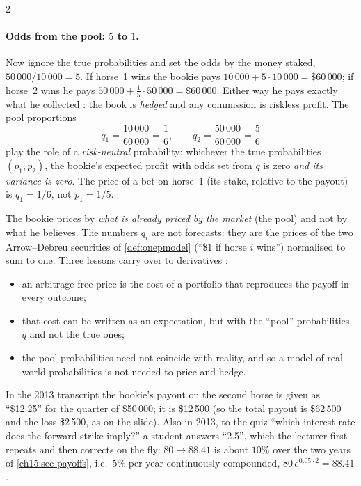 \begin{paracol}{2}
\paragraph{Odds from the pool: $5$ to $1$.} Now ignore the true probabilities and set the odds by the money
staked, $50\,000/10\,000=5$. If horse~1 wins the bookie pays $10\,000+5\cdot10\,000=\$60\,000$; if horse~2 wins he pays
$50\,000+\tfrac15\cdot50\,000=\$60\,000$. Either way he pays exactly what he collected : the book is
\emph{hedged} and any commission is riskless profit. The pool proportions
\[
  q_1=\frac{10\,000}{60\,000}=\frac16,\qquad q_2=\frac{50\,000}{60\,000}=\frac56
\]
play the role of a \emph{risk-neutral} probability: whichever the true probabilities $(p_1,p_2)$, the bookie's
expected profit with odds set from $q$ is zero \emph{and its variance is zero}. The price of a bet on horse~1 (its stake,
relative to the payout) is $q_1=1/6$, not $p_1=1/5$.

\begin{intuition}
The bookie prices by \emph{what is already priced by the market} (the pool) and not by what he believes. The
numbers $q_i$ are not forecasts: they are the prices of the two Arrow--Debreu securities of \cref{def:onepmodel}
(``\$1 if horse $i$ wins'') normalised to sum to one. Three lessons carry over to derivatives :
\begin{itemize}
  \item an arbitrage-free price is the cost of a portfolio that reproduces the payoff in every outcome;
  \item that cost can be written as an expectation, but with the ``pool'' probabilities $q$ and not the
      true ones;
  \item the pool probabilities need not coincide with reality, and so a model of real-world
      probabilities is not needed to price and hedge.
\end{itemize}
\end{intuition}

\begin{coursenote}
In the 2013 transcript the bookie's payout on the second horse is given as ``\$12.25'' for the quarter of \$50\,000;
it is \$12\,500 (so the total payout is \$62\,500 and the loss \$2\,500, as on the slide). Also in 2013,
to the quiz ``which interest rate does the forward strike imply?'' a student answers ``2.5'', which the lecturer first
repeats and then corrects on the fly: $80\to88.41$ is about $10\%$ over the two years of \cref{ch15:sec-payoffs}, i.e.\ $5\%$ per year
continuously compounded, $80\,e^{0.05\cdot2}=88.41$ .
\end{coursenote}


\end{paracol}
